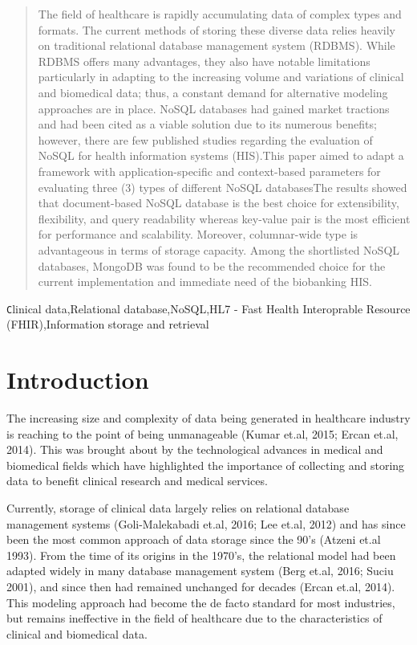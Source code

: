\documentclass[review]{elsarticle}
\begin{document}
\begin{frontmatter}
\begin{abstract}
The field of healthcare is rapidly accumulating data of complex types and formats. The current methods of storing these diverse data relies heavily on traditional relational database management system (RDBMS). While RDBMS offers many advantages, they also have notable limitations particularly in adapting to the increasing volume and variations of clinical and biomedical data; thus, a constant demand for alternative modeling approaches are in place. NoSQL databases had gained market tractions and had been cited as a viable solution due to its numerous benefits; however, there are few published studies regarding the evaluation of NoSQL for health information systems (HIS).This paper aimed to adapt a framework with application-specific and context-based parameters for evaluating three (3) types of different NoSQL databasesThe results showed that document-based NoSQL database is the best choice for extensibility, flexibility, and query readability whereas key-value pair is the most efficient for performance and scalability. Moreover, columnar-wide type is advantageous in terms of storage capacity. Among the shortlisted NoSQL databases, MongoDB was found to be the recommended choice for the current implementation and immediate need of the biobanking HIS.
\end{abstract}

\begin{keyword}
\texttt Clinical data\sep Relational database\sep NoSQL\sep HL7 - Fast Health Interoprable Resource (FHIR)\sep Information storage and retrieval
\end{keyword}

\end{frontmatter}

\linenumbers

\section{Introduction}
The increasing size and complexity of data being generated in healthcare industry is reaching to the point of being unmanageable (Kumar et.al, 2015; Ercan et.al, 2014). This was brought about by the technological advances in medical and biomedical fields which have highlighted the importance of collecting and storing data to benefit clinical research and medical services.

Currently, storage of clinical data largely relies on relational database management systems (Goli-Malekabadi et.al, 2016; Lee et.al, 2012) and has since been the most common approach of data storage since the 90’s (Atzeni et.al 1993). From the time of its origins in the 1970’s, the relational model had been adapted widely in many database management system (Berg et.al, 2016; Suciu 2001), and since then had remained unchanged for decades (Ercan et.al, 2014). This modeling approach had become the de facto standard for most industries, but remains ineffective in the field of healthcare due to the characteristics of clinical and biomedical data.
\end{document}
